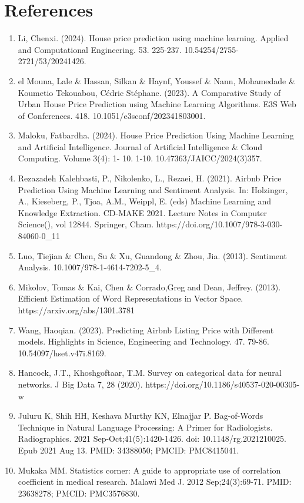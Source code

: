 \documentclass[a4paper,12pt]{article}
\begin{document}
\section*{References}
\begin{enumerate}
  \item Li, Chenxi. (2024). House price prediction using machine learning. Applied and Computational Engineering. 53. 225-237. 10.54254/2755-2721/53/20241426.
  \item el Mouna, Lale \& Hassan, Silkan \& Haynf, Youssef \& Nann, Mohamedade \& Koumetio Tekouabou, Cédric Stéphane. (2023). A Comparative Study of Urban House Price Prediction using Machine Learning Algorithms. E3S Web of Conferences. 418. 10.1051/e3sconf/202341803001.
  \item Maloku, Fatbardha. (2024). House Price Prediction Using Machine Learning and Artificial Intelligence. Journal of Artificial Intelligence \& Cloud Computing. Volume 3(4): 1- 10. 1-10. 10.47363/JAICC/2024(3)357.
  \item Rezazadeh Kalehbasti, P., Nikolenko, L., Rezaei, H. (2021). Airbnb Price Prediction Using Machine Learning and Sentiment Analysis. In: Holzinger, A., Kieseberg, P., Tjoa, A.M., Weippl, E. (eds) Machine Learning and Knowledge Extraction. CD-MAKE 2021. Lecture Notes in Computer Science(), vol 12844. Springer, Cham. https://doi.org/10.1007/978-3-030-84060-0\_11
  \item Luo, Tiejian \& Chen, Su \& Xu, Guandong \& Zhou, Jia. (2013). Sentiment Analysis. 10.1007/978-1-4614-7202-5\_4.
  \item Mikolov, Tomas \& Kai, Chen \& Corrado,Greg and Dean, Jeffrey. (2013). Efficient Estimation of Word Representations in Vector Space. https://arxiv.org/abs/1301.3781
  \item Wang, Haoqian. (2023). Predicting Airbnb Listing Price with Different models. Highlights in Science, Engineering and Technology. 47. 79-86. 10.54097/hset.v47i.8169.
  \item Hancock, J.T., Khoshgoftaar, T.M. Survey on categorical data for neural networks. J Big Data 7, 28 (2020). https://doi.org/10.1186/s40537-020-00305-w
  \item Juluru K, Shih HH, Keshava Murthy KN, Elnajjar P. Bag-of-Words Technique in Natural Language Processing: A Primer for Radiologists. Radiographics. 2021 Sep-Oct;41(5):1420-1426. doi: 10.1148/rg.2021210025. Epub 2021 Aug 13. PMID: 34388050; PMCID: PMC8415041.
  \item Mukaka MM. Statistics corner: A guide to appropriate use of correlation coefficient in medical research. Malawi Med J. 2012 Sep;24(3):69-71. PMID: 23638278; PMCID: PMC3576830.

\end{enumerate}
\end{document}
